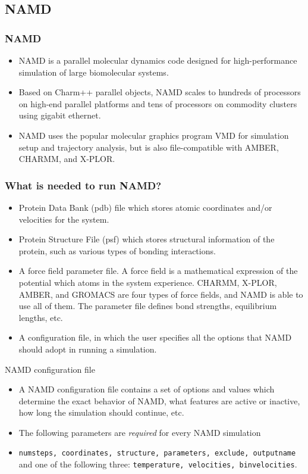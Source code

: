 \documentclass[slidestop,mathserif,compress,xcolor=svgnames]{beamer}
\begin{document}
\subsection{NAMD}
\begin{frame}
  \frametitle{\small NAMD}
  \begin{block}{}
    \begin{itemize}
      \item NAMD is a parallel molecular dynamics code designed for high-performance simulation of large biomolecular systems. 
      \item Based on Charm++ parallel objects, NAMD scales to hundreds of processors on high-end parallel platforms and tens of processors on commodity clusters using gigabit ethernet.
      \item NAMD uses the popular molecular graphics program VMD for simulation setup and trajectory analysis, but is also file-compatible with AMBER, CHARMM, and X-PLOR.
    \end{itemize}
  \end{block}
\end{frame}

\begin{frame}
  \frametitle{\small What is needed to run NAMD?}
  {\scriptsize
  \begin{itemize}
    \item Protein Data Bank (pdb) file which stores atomic coordinates and/or velocities for the system.
    \item Protein Structure File (psf) which stores structural information of the protein, such as various types of bonding interactions.
    \item A force field parameter file. A force field is a mathematical expression of the potential which atoms in the system experience. CHARMM, X-PLOR, AMBER, and GROMACS are four types of force fields, and NAMD is able to use all of them. The parameter file defines bond strengths, equilibrium lengths, etc. 
    \item A configuration file, in which the user specifies all the options that NAMD should adopt in running a simulation.
  \end{itemize}
  \begin{block}{NAMD configuration file}
    \begin{itemize}
      \item A NAMD configuration file contains a set of options and values which determine the exact behavior of NAMD, what features are active or inactive, how long the simulation should continue, etc.
      \item The following parameters are \textit{required} for every NAMD simulation
      \item[] \texttt{numsteps, coordinates, structure, parameters, exclude, outputname} and one of the following three: \texttt{temperature, velocities, binvelocities}.
    \end{itemize}
  \end{block}
  }
\end{frame}
\end{document}
